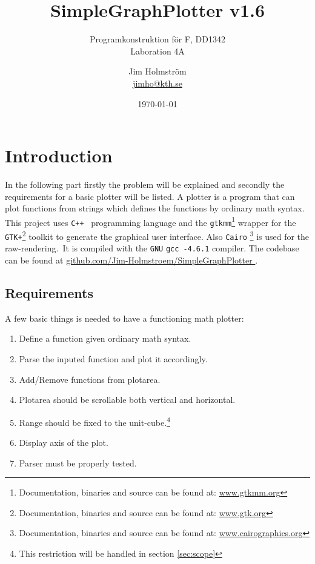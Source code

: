 \documentclass[a4paper,11pt]{kth-mag}
\title{SimpleGraphPlotter v1.6}
\subtitle{Programkonstruktion f\"{o}r F, DD1342\\ Laboration 4A}
\author{Jim Holmstr\"{o}m\\\href{mailto:jimho@kth.se}{jimho@kth.se}}
\date{\today}
\newcommand{\Cpp}{\texttt{C++}}
\newcommand{\Gcc}{\texttt{gcc}}
\newcommand{\Gtkmm}{\texttt{gtkmm}}
\newcommand{\Gtk}{\texttt{GTK+}}
\newcommand{\Cairo}{\texttt{Cairo}}
\begin{document}
\frontmatter
\pagestyle{empty}
\removepagenumbers
\maketitle
{}
\tableofcontents*
\mainmatter
\pagestyle{newchap}

\chapter{Introduction}
In the following part firstly the problem will be explained and secondly 
the requirements for a basic plotter will be listed.
A plotter is a program that can plot functions from strings which defines the 
functions by ordinary math syntax. 
This project uses \Cpp~ programming language and the 
\Gtkmm\footnote{Documentation, binaries and source can be found at: 
\href{http://www.gtkmm.org}{www.gtkmm.org}} wrapper for the 
\Gtk\footnote{Documentation, binaries and source can be found at: 
\href{http://www.gtk.org}{www.gtk.org}} toolkit to generate the graphical user interface.
Also \Cairo
\footnote{Documentation, binaries and source can be found at:
\href{http://www.cairographics.org/}{www.cairographics.org}
}
is used for the raw-rendering.\
It is compiled with the \texttt{GNU} \Gcc~\texttt{-4.6.1} compiler.
The codebase can be found at
\href{
    https://github.com/Jim-Holmstroem/SimpleGraphPlotter
}{
    github.com/Jim-Holmstroem/SimpleGraphPlotter
}.

\section{Requirements}
A few basic things is needed to have a functioning math plotter:
\begin{enumerate}
\item Define a function given ordinary math syntax.
\item Parse the inputed function and plot it accordingly.
\item Add/Remove functions from plotarea.
\item Plotarea should be scrollable both vertical and horizontal.
\item Range should be fixed to the unit-cube.\footnote{This restriction will be handled in section \ref{sec:scope}}
\item Display axis of the plot.
\item Parser must be properly tested.
\end{enumerate}
\end{document}
